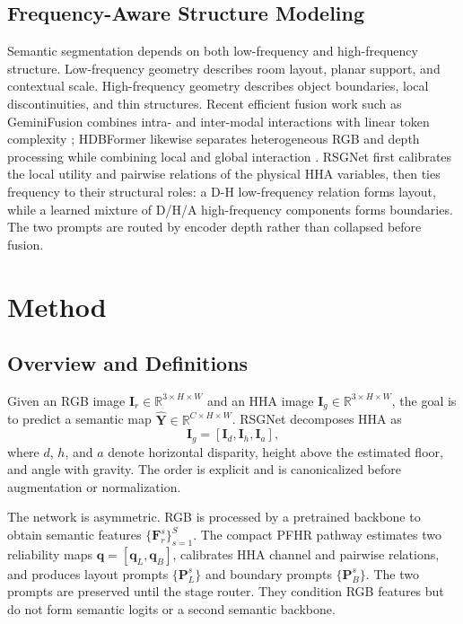 \documentclass[a4paper,fleqn]{cas-dc}
\begin{document}
\subsection{Frequency-Aware Structure Modeling}

Semantic segmentation depends on both low-frequency and high-frequency structure. Low-frequency geometry describes room layout, planar support, and contextual scale. High-frequency geometry describes object boundaries, local discontinuities, and thin structures. Recent efficient fusion work such as GeminiFusion combines intra- and inter-modal interactions with linear token complexity \citep{ding2024geminifusion}; HDBFormer likewise separates heterogeneous RGB and depth processing while combining local and global interaction \citep{wei2025hdbformer}. RSGNet first calibrates the local utility and pairwise relations of the physical HHA variables, then ties frequency to their structural roles: a D-H low-frequency relation forms layout, while a learned mixture of D/H/A high-frequency components forms boundaries. The two prompts are routed by encoder depth rather than collapsed before fusion.

\section{Method}\label{sec:method}

\subsection{Overview and Definitions}

Given an RGB image $\mathbf{I}_{r}\in\mathbb{R}^{3\times H\times W}$ and an HHA image $\mathbf{I}_{g}\in\mathbb{R}^{3\times H\times W}$, the goal is to predict a semantic map $\hat{\mathbf{Y}}\in\mathbb{R}^{C\times H\times W}$. RSGNet decomposes HHA as
\begin{equation}
  \mathbf{I}_{g}=[\mathbf{I}_{d},\mathbf{I}_{h},\mathbf{I}_{a}],
\end{equation}
where $d$, $h$, and $a$ denote horizontal disparity, height above the estimated floor, and angle with gravity. The order is explicit and is canonicalized before augmentation or normalization.

The network is asymmetric. RGB is processed by a pretrained backbone to obtain semantic features $\{\mathbf{F}_{r}^{s}\}_{s=1}^{S}$. The compact PFHR pathway estimates two reliability maps $\mathbf{q}=[\mathbf{q}_{L},\mathbf{q}_{B}]$, calibrates HHA channel and pairwise relations, and produces layout prompts $\{\mathbf{P}_{L}^{s}\}$ and boundary prompts $\{\mathbf{P}_{B}^{s}\}$. The two prompts are preserved until the stage router. They condition RGB features but do not form semantic logits or a second semantic backbone.
\end{document}
